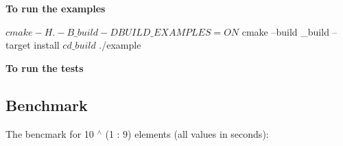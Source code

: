 {\bfseries To run the examples}


\begin{DoxyCode}
$ cmake -H. -B\_build -DBUILD\_EXAMPLES=ON
$ cmake --build \_build --target install
$ cd \_build
$ ./example
\end{DoxyCode}


{\bfseries To run the tests}




\subsection*{Benchmark}

The bencmark for 10 $^\wedge$ (1 \+: 9) elements (all values in seconds)\+:

